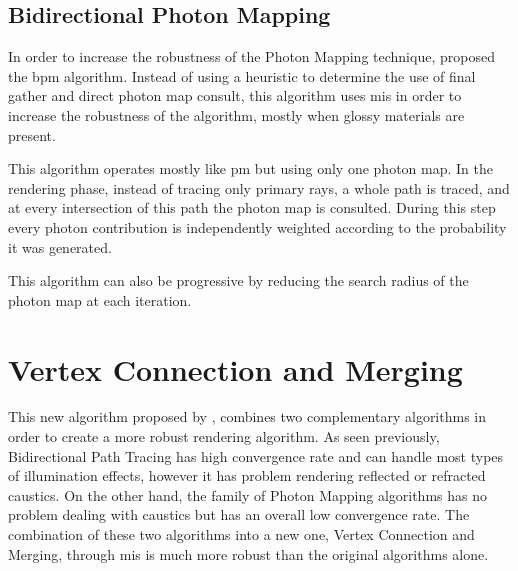 \subsection{Bidirectional Photon Mapping}

In order to increase the robustness of the Photon Mapping technique, \cite{Vorba} proposed the \gls{bpm} algorithm. Instead of using a heuristic to determine the use of final gather and direct photon map consult, this algorithm uses \gls{mis} in order to increase the robustness of the algorithm, mostly when glossy materials are present.

This algorithm operates mostly like \gls{pm} but using only one photon map. In the rendering phase, instead of tracing only primary rays, a whole path is traced, and at every intersection of this path the photon map is consulted. During this step every photon contribution is independently weighted according to the probability it was generated.

This algorithm can also be progressive by reducing the search radius of the photon map at each iteration.

\section{Vertex Connection and Merging}

This new algorithm proposed by \cite{Georgiev}, combines two complementary algorithms in order to create a more robust rendering algorithm. As seen previously, Bidirectional Path Tracing has high convergence rate and can handle most types of illumination effects, however it has problem rendering reflected or refracted caustics. On the other hand, the family of Photon Mapping algorithms has no problem dealing with caustics but has an overall low convergence rate. The combination of these two algorithms into a new one, Vertex Connection and Merging, through \gls{mis} is much more robust than the original algorithms alone.

